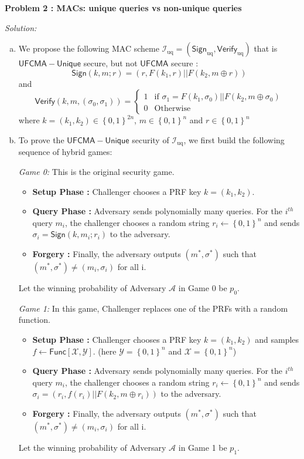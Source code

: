 \documentclass[a4paper, 11pt]{article}
\newenvironment{solution}
    {\textit{Solution:}}
    {\clearpage}
\newcommand{\prob}[1]{\begin{mdframed}[backgroundcolor=gray!20] \textbf{Problem #1}\end{mdframed}}
\newcommand{\bit}{\left\{0, 1\right\}}
\newcommand{\sign}{\mathsf{Sign}}
\newcommand{\verify}{\mathsf{Verify}}
\newcommand{\func}{\mathsf{Func}}
\newcommand{\calA}{\mathcal{A}}
\newcommand{\calI}{\mathcal{I}}
\newcommand{\calX}{\mathcal{X}}
\newcommand{\calY}{\mathcal{Y}}
\begin{document}
\prob{2 : MACs: unique queries vs non-unique queries}
\begin{solution}
    \begin{enumerate}[(a)]
        \item We propose the following MAC scheme $\calI_\text{uq} = (\sign_\text{uq}, \verify_\text{uq})$ that is $\mathsf{UFCMA-Unique}$ secure, but not $\mathsf{UFCMA}$ secure :
              $$\sign(k, m; r) = (r, F(k_1, r) || F(k_2, m \oplus r))$$ and
              $$\verify(k, m, (\sigma_0, \sigma_1)) = 
              \begin{cases}
                      1 & \text{if } \sigma_1 = F(k_1, \sigma_0) || F(k_2, m \oplus \sigma_0) \\
                      0 & \text{Otherwise}
                  \end{cases}$$
              where $k = (k_1, k_2) \in \bit^{2n}$, $m \in \bit^n$ and $r \in \bit^n$

        \item To prove the $\mathsf{UFCMA-Unique}$ security of $\calI_\text{uq}$, we first build the following sequence of hybrid games:

              \textit{Game 0:} This is the original security game.
              \begin{itemize}
                  \item \textbf{Setup Phase :} Challenger chooses a PRF key $k = (k_1, k_2)$.
                  \item \textbf{Query Phase :} Adversary sends polynomially many queries. For the $i^{th}$ query $m_i$, the challenger chooses a random string $r_i \leftarrow \bit^n$ and sends $\sigma_i = \sign(k, m_i ; r_i)$ to the adversary.
                  \item \textbf{Forgery :} Finally, the adversary outputs $(m^*, \sigma^*)$ such that $(m^*, \sigma^*) \neq (m_i, \sigma_i)$ for all i.
              \end{itemize}
              Let the winning probability of Adversary $\calA$ in Game 0 be $p_0$.
              \vspace{20pt}

              \textit{Game 1:} In this game, Challenger replaces one of the PRFs with a random function.
              \begin{itemize}
                  \item \textbf{Setup Phase :} Challenger chooses a PRF key $k = (k_1, k_2)$ and samples $f \leftarrow \func[\calX, \calY]$. (here $\calY = \bit^n$ and $\calX = \bit^n$)
                  \item \textbf{Query Phase :} Adversary sends polynomially many queries. For the $i^{th}$ query $m_i$, the challenger chooses a random string $r_i \leftarrow \bit^n$ and sends $\sigma_i = (r_i,f(r_i) || F(k_2, m \oplus r_i))$ to the adversary.
                  \item \textbf{Forgery :} Finally, the adversary outputs $(m^*, \sigma^*)$ such that $(m^*, \sigma^*) \neq (m_i, \sigma_i)$ for all i.
              \end{itemize}
              Let the winning probability of Adversary $\calA$ in Game 1 be $p_1$.
              \vspace{20pt}


\end{enumerate}
\end{solution}
\end{document}
